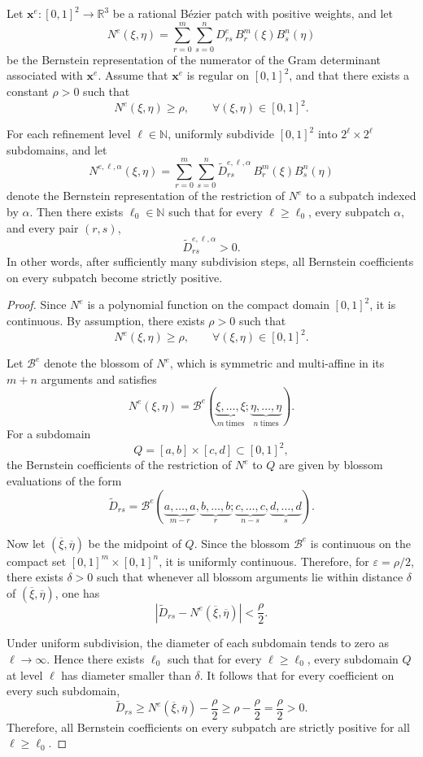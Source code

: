 \documentclass{jssc}
\def\bar{\overline}
\begin{document}
\begin{theorem}
\label{thm:subdivision_sign_consistency}
Let $\mathbf{x}^e : [0,1]^2 \to \mathbb{R}^3$ be a rational B\'ezier patch with positive weights, and let
\[
N^e(\xi,\eta)
=
\sum_{r=0}^{m}\sum_{s=0}^{n} D_{rs}^e \, B_r^m(\xi) B_s^n(\eta)
\]
be the Bernstein representation of the numerator of the Gram determinant associated with $\mathbf{x}^e$.
Assume that $\mathbf{x}^e$ is regular on $[0,1]^2$, and that there exists a constant $\rho>0$ such that
\[
N^e(\xi,\eta)\ge \rho,
\qquad \forall (\xi,\eta)\in [0,1]^2.
\]

For each refinement level $\ell\in\mathbb{N}$, uniformly subdivide $[0,1]^2$ into $2^\ell\times 2^\ell$ subdomains, and let
\[
N^{e,\ell,\alpha}(\xi,\eta)
=
\sum_{r=0}^{m}\sum_{s=0}^{n} \widetilde D_{rs}^{e,\ell,\alpha}\, B_r^m(\xi) B_s^n(\eta)
\]
denote the Bernstein representation of the restriction of $N^e$ to a subpatch indexed by $\alpha$.
Then there exists $\ell_0\in\mathbb{N}$ such that for every $\ell\ge \ell_0$, every subpatch $\alpha$, and every pair $(r,s)$,
\[
\widetilde D_{rs}^{e,\ell,\alpha} > 0.
\]
In other words, after sufficiently many subdivision steps, all Bernstein coefficients on every subpatch become strictly positive.
\end{theorem}

\begin{proof}
Since $N^e$ is a polynomial function on the compact domain $[0,1]^2$, it is continuous. By assumption, there exists $\rho>0$ such that
\[
N^e(\xi,\eta)\ge \rho,
\qquad \forall (\xi,\eta)\in[0,1]^2.
\]

Let $\mathcal{B}^e$ denote the blossom of $N^e$, which is symmetric and multi-affine in its $m+n$ arguments and satisfies
\[
N^e(\xi,\eta)
=
\mathcal{B}^e(\underbrace{\xi,\ldots,\xi}_{m\ \text{times}};
\underbrace{\eta,\ldots,\eta}_{n\ \text{times}}).
\]
For a subdomain
\[
Q=[a,b]\times[c,d]\subset [0,1]^2,
\]
the Bernstein coefficients of the restriction of $N^e$ to $Q$ are given by blossom evaluations of the form
\[
\widetilde D_{rs}
=
\mathcal{B}^e(\underbrace{a,\ldots,a}_{m-r},
\underbrace{b,\ldots,b}_{r};
\underbrace{c,\ldots,c}_{n-s},
\underbrace{d,\ldots,d}_{s}).
\]

Now let $(\bar\xi,\bar\eta)$ be the midpoint of $Q$. Since the blossom $\mathcal{B}^e$ is continuous on the compact set $[0,1]^m\times[0,1]^n$, it is uniformly continuous. Therefore, for $\varepsilon=\rho/2$, there exists $\delta>0$ such that whenever all blossom arguments lie within distance $\delta$ of $(\bar\xi,\bar\eta)$, one has
\[
\left|
\widetilde D_{rs} - N^e(\bar\xi,\bar\eta)
\right|
< \frac{\rho}{2}.
\]

Under uniform subdivision, the diameter of each subdomain tends to zero as $\ell\to\infty$. Hence there exists $\ell_0$ such that for every $\ell\ge \ell_0$, every subdomain $Q$ at level $\ell$ has diameter smaller than $\delta$. It follows that for every coefficient on every such subdomain,
\[
\widetilde D_{rs}
\ge
N^e(\bar\xi,\bar\eta) - \frac{\rho}{2}
\ge
\rho - \frac{\rho}{2}
=
\frac{\rho}{2}
>0.
\]
Therefore, all Bernstein coefficients on every subpatch are strictly positive for all $\ell\ge \ell_0$.
\end{proof}
\end{document}

